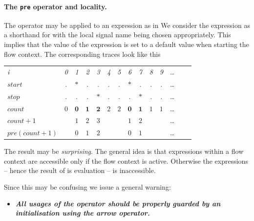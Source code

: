 \paragraph{The \texttt{pre} operator and locality.} The operator  may
be applied to an expression as in
%
%
We consider the expression  as a shorthand for
%
%
with the local signal name  being chosen appropriately. 
This implies that the value of the expression is set to a default value when
starting the flow context. The corresponding traces look like this
\begin{center}
  \leavevmode
  \begin{tabular}[]{l@{\quad}||@{\quad}ccccccccccccc}
    \hline\hline
     \hbox{{\footnotesize \textit{i}}} &{\footnotesize \textit{0}}
     &{\footnotesize \textit{1}}&{\footnotesize \textit{2}}
     &{\footnotesize \textit{3}}&{\footnotesize \textit{4}}
     &{\footnotesize \textit{5}}&{\footnotesize \textit{6}}
     &{\footnotesize \textit{7}}&{\footnotesize \textit{8}}
     &{\footnotesize \textit{9}}&\ldots
   \\      
    \hbox{$start$} &.&$*$&.&.&.&.&$*$&.&.&.&\ldots
   \\
    \hbox{$stop$} &.&.&.&$*$&.&.&.&$*$&.&.&\ldots
   \\          
   \hbox{$count$} &$\mathit{0}$&$\mathbf{0}$&$\mathbf{1}$&$\mathbf{2}$
   &$\mathit{2}$&$\mathit{2}$&$\mathbf{0}$&$\mathbf{1}$&
   $\mathit{1}$&$\mathit{1}$&\ldots
   \\
   \hbox{$count + 1$} &&$\mathit{1}$&$\mathit{2}$&$\mathit{3}$&
   &&$\mathit{1}$&$\mathit{2}$&&&\ldots
   \\   
   \hbox{$pre(count + 1)$} &&$\mathit{0}$&$\mathit{1}$&
   $\mathit{2}$&&&$\mathit{0}$&$\mathit{1}$&&&\ldots
   \\     \hline\hline
  \end{tabular}
\end{center}
The result may be \emph{surprising}. The general idea is that expressions within a flow context are accessible only if the flow context is active. Otherwise the expressions -- hence the result of is evaluation -- is inaccessible.

Since this may be confusing we issue a general warning:
\begin{itemize}
\item \emph{\textbf{All usages of the operator \emph{} should be properly guarded by an initialisation using the arrow operator.}}
\end{itemize}


